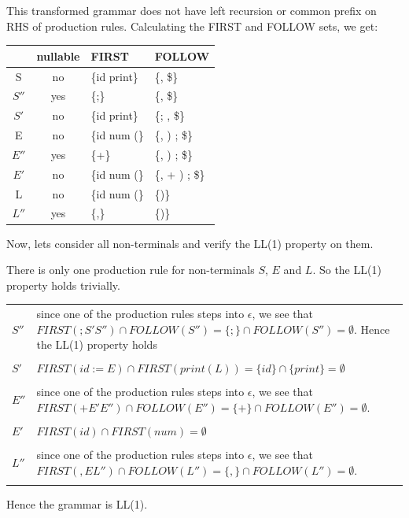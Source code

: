 \documentclass{article}
\begin{document}
    This transformed grammar does not have left recursion or common prefix on RHS of production rules. Calculating the FIRST and FOLLOW sets, we get:

    \begin{center}
        \begin{tabular}{ c c l l }
            \hline
            & nullable & FIRST & FOLLOW \\
            \hline
            S & no & \{id print\} & \{, \$\} \\
            $S''$ & yes & \{;\} & \{, \$\} \\
            $S'$ & no & \{id print\} & \{; , \$\} \\
            E & no & \{id num (\} & \{, ) ; \$\} \\
            $E''$ & yes & \{+\} & \{, ) ; \$\} \\
            $E'$ & no & \{id num (\} & \{, + ) ; \$\} \\
            L & no & \{id num (\} & \{)\} \\
            $L''$ & yes & \{,\} & \{)\} \\
        \end{tabular}
    \end{center}

    Now, lets consider all non-terminals and verify the LL(1) property on them.

    There is only one production rule for non-terminals $S$, $E$ and $L$. So the LL(1) property holds trivially.

    \begin{center}
        \begin{tabular}{m{3em} m{25em}}
            $S''$ & since one of the production rules steps into $\epsilon$, we see that $FIRST(; S' S'') \cap FOLLOW(S'') = \{;\} \cap FOLLOW(S'') = \emptyset$. Hence the LL(1) property holds \\ \\
            $S'$ & $FIRST(id := E) \cap FIRST(print (L)) = \{id\} \cap \{print\} = \emptyset$ \\ \\
            $E''$ & since one of the production rules steps into $\epsilon$, we see that $FIRST(+ E' E'') \cap FOLLOW(E'') = \{+\} \cap FOLLOW(E'') = \emptyset$. \\ \\
            $E'$ & $FIRST(id) \cap FIRST(num) = \emptyset$ \\ \\
            $L''$ & since one of the production rules steps into $\epsilon$, we see that $FIRST(, E L'') \cap FOLLOW(L'') = \{,\} \cap FOLLOW(L'') = \emptyset$. \\ \\
        \end{tabular}
    \end{center}

    Hence the grammar is LL(1).
    
\end{document}
